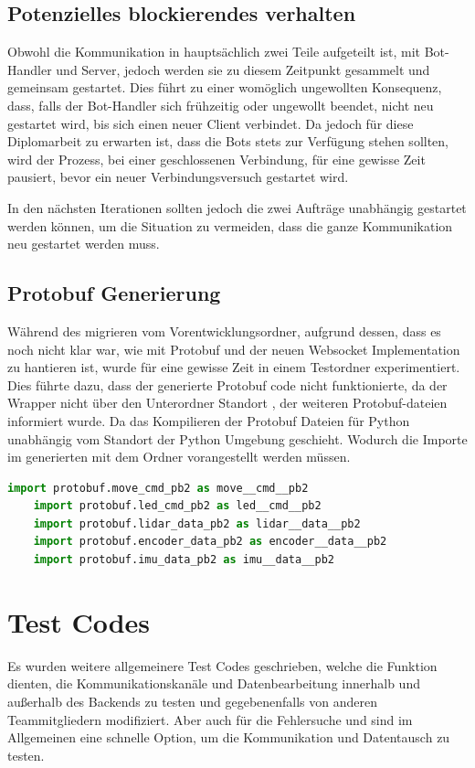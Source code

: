\subsection{Potenzielles blockierendes verhalten}
Obwohl die Kommunikation in hauptsächlich zwei Teile aufgeteilt ist, 
mit Bot-Handler und Server, 
jedoch werden sie zu diesem Zeitpunkt gesammelt und gemeinsam gestartet.
Dies führt zu einer womöglich ungewollten Konsequenz,
dass, falls der Bot-Handler sich frühzeitig oder ungewollt beendet, 
nicht neu gestartet wird, bis sich einen neuer Client verbindet.
% 
Da jedoch für diese Diplomarbeit zu erwarten ist, 
dass die Bots stets zur Verfügung stehen sollten,
wird der Prozess, bei einer geschlossenen Verbindung,
für eine gewisse Zeit pausiert, bevor ein neuer Verbindungsversuch gestartet wird.

In den nächsten Iterationen sollten jedoch 
die zwei Aufträge unabhängig gestartet werden können, 
um die Situation zu vermeiden, 
dass die ganze Kommunikation neu gestartet werden muss.

\subsection{Protobuf Generierung}
Während des migrieren vom Vorentwicklungsordner, 
aufgrund dessen, dass es noch nicht klar war, wie mit Protobuf 
und der neuen Websocket Implementation zu hantieren ist, 
wurde für eine gewisse Zeit in einem Testordner experimentiert.
Dies führte dazu, dass der generierte Protobuf code nicht funktionierte,
da der Wrapper nicht über den Unterordner Standort , 
der weiteren Protobuf-dateien informiert wurde.
Da das Kompilieren der Protobuf Dateien für Python unabhängig vom Standort
der Python Umgebung geschieht. 
Wodurch die Importe im generierten 
mit dem Ordner vorangestellt werden müssen.

\begin{lstlisting}[language=python, gobble=4]
    import protobuf.move_cmd_pb2 as move__cmd__pb2
    import protobuf.led_cmd_pb2 as led__cmd__pb2
    import protobuf.lidar_data_pb2 as lidar__data__pb2
    import protobuf.encoder_data_pb2 as encoder__data__pb2
    import protobuf.imu_data_pb2 as imu__data__pb2
\end{lstlisting}


\section{Test Codes}
Es wurden weitere allgemeinere Test Codes geschrieben, 
welche die Funktion dienten, die Kommunikationskanäle und Datenbearbeitung innerhalb 
und außerhalb des Backends zu testen und gegebenenfalls 
von anderen Teammitgliedern modifiziert.
% 
Aber auch für die Fehlersuche 
und sind im Allgemeinen eine schnelle Option, 
um die Kommunikation und Datentausch zu testen.

